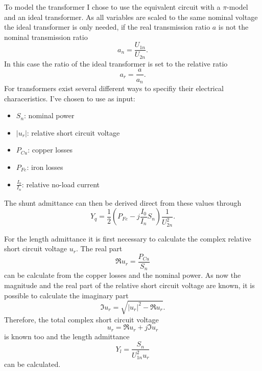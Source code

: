 To model the transformer I chose to use the equivalent circuit  with a $\pi$-model and an ideal transformer. As all variables are scaled to the same nominal voltage the ideal transformer is only needed, if the real transmission ratio $a$ is not the nominal transmission ratio
\begin{equation}
	a_n = \frac{U_{1n}}{U_{2n}}.
\end{equation}
In this case the ratio of the ideal transformer is set to the relative ratio
\begin{equation}
	a_r = \frac{a}{a_n}.
\end{equation}
For transformers exist several different ways to specifiy their electrical characeristics. I've chosen to use as input:
\begin{itemize}
	\item $S_n$: nominal power
	\item $|u_r|$: relative short circuit voltage
	\item $P_{Cu}$: copper losses
	\item $P_{Fe}$: iron losses
	\item $\frac{I_0}{I_n}$: relative no-load current
\end{itemize}

The shunt admittance can then be derived direct from these values through
\begin{equation}
	Y_q = \frac{1}{2} \left( P_{Fe} - j \frac{I_0}{I_n} S_n \right) \frac{1}{U_{2n}^2}.
\end{equation}

For the length admittance it is first necessary to calculate the complex relative short circuit voltage $u_r$. The real part
\begin{equation}
	\Re{u_r} = \frac{P_{Cu}}{S_n}
\end{equation}
can be calculate from the copper losses and the nominal power. As now the magnitude and the real part of the relative short circuit voltage are known, it is possible to calculate the imaginary part
\begin{equation}
	\Im{u_r} = \sqrt{|u_r|^2 - \Re{u_r}}.
\end{equation}
Therefore, the total complex short circuit voltage
\begin{equation}
	u_r = \Re{u_r} + j \Im{u_r}
\end{equation}
is known too and the length admittance
\begin{equation}
	Y_l = \frac{S_n}{U_{1n}^2 u_r}
\end{equation}
can be calculated.

